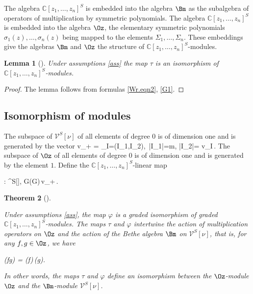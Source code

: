 \documentclass[12pt]{amsart}
\let\Medskip\medskip
\def\medskip{\par\Medskip}
\newtheorem{thm}{Theorem}[section]
\newtheorem{lem}[thm]{Lemma}
\numberwithin{equation}{section}
\theoremstyle{definition}
\let\mc\mathcal
\let\phi\varphi
\let\si\sigma
\let\Si\Sigma
\def\C{{\mathbb C}}
\def\V{{\mc V}}
\begin{document}
The algebra $\C[z_1,\dots,z_n]^S$
 is embedded into the algebra $\Bm$ as the subalgebra of operators
of multiplication by symmetric polynomials.
 The
algebra $\C[z_1,\dots,z_n]^S$ is embedded into the algebra $\Oz$, the elementary symmetric polynomials
$\si_1(z),\dots,\si_n(z)$ being mapped to the elements
$\Si_1,\dots,\Si_n$. These
embeddings give the algebras $\Bm$ and $\Oz$ the structure of $\C[z_1,\dots,z_n]^S$-modules.

\begin{lem}
[{\cite[Lemma 6.4]{MTV3}}]
\label{lem iso m}
Under assumptions \eqref{ass} the map $\tau$ is an isomorphism of $\C[z_1,\dots,z_n]^S$-modules.

\end{lem}

\begin{proof}
The lemma follows from formulas \eqref{Wr.eqn2}, \eqref{G1}.
\end{proof}

\subsection{Isomorphism of modules}
\label{sec imo}

The subspace of $\V^S[\nu]$ of all elements of degree $0$ is of dimension one and is generated by the vector
\bea
v_+ = \sum_{I=(I_1,I_2),\, |I_1|=m, |I_2|=\ell} v_I\,.
\eea
The subspace of $\Oz$ of all elements of degree $0$ is of dimension one and is generated by the element $1$.
Define the $\C[z_1,\dots,z_n]^S$-linear map

\bean
\label{ups}
\phi : \Oz \to \V^S[\nu], \quad G\mapsto \tau(G)\,v_+\,.
\eean
\medskip




\begin{thm}
[{\cite[Theorem 6.7]{MTV3}}]

\label{thm ups}

Under assumptions \eqref{ass}, the map $\phi$ is a graded isomorphism of graded $\C[z_1,\dots,z_n]^S$-modules. 
The maps $\tau$ and $\phi$ intertwine the action of multiplication
operators on $\Oz$  and the action of the Bethe algebra $\Bm$  on $\V^S[\nu]$, that is, for any 
$f,g \in\Oz$, we have

\bean
\label{inter}
\phi(fg) = \tau(f)\,\phi(g).
\eean
${}$

\noindent
In other words, the maps $\tau$ and $\phi$ define an isomorphism between the $\Oz$-module $\Oz$ and the
$\Bm$-module $\V^S[\nu]$.


\end{thm}
\end{document}
